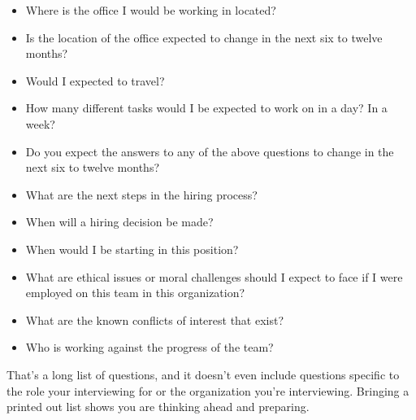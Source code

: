 \begin{itemize}
    \item Where is the office I would be working in located?
    \item Is the location of the office expected to change in the next six to twelve months?
    \item Would I expected to travel?
    
    \item How many different tasks would I be expected to work on in a day? In a week?
    
    \item Do you expect the answers to any of the above questions to change in the next six to twelve months?

    \item What are the next steps in the hiring process?
    \item When will a hiring decision be made?
    \item When would I be starting in this position?
    
    \item What are ethical issues or moral challenges should I expect to face if I were employed on this team in this organization?
    \item What are the known conflicts of interest that exist?

    \item Who is working against the progress of the team?
    
\end{itemize}

That's a long list of questions, and it doesn't even include questions specific to the role your interviewing for or the organization you're interviewing. Bringing a printed out list shows you are thinking ahead and preparing. 

